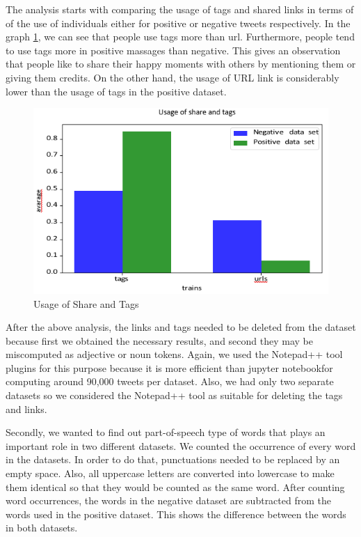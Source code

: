 \documentclass[10pt,conference,compsocconf]{IEEEtran}
\begin{document}
The analysis starts with comparing the usage of tags and shared links in terms of of the use of individuals either for positive or negative tweets respectively. In the graph \ref{fig2}, we can see that people use tags more than url. Furthermore, people tend to use tags more in positive massages than negative. This gives an observation that people like to share their happy moments with others by mentioning them or giving them credits. On the other hand, the usage of URL link is considerably lower than the usage of tags in the positive dataset.

\begin{tiny}
	\begin{figure}[b] \label{fig2}
		\includegraphics[scale=0.6]{Lkhamaa1.png}   
		\caption{Usage of Share and Tags }
		\label{fig2}    
	\end{figure}
\end{tiny}

After the above analysis, the links and tags needed to be deleted from the dataset because first we obtained the necessary results, and second they may be miscomputed as adjective or noun tokens. Again, we used the Notepad++ tool plugins for this purpose because it is more efficient than jupyter notebookfor computing around 90,000 tweets per dataset. Also, we had only two separate datasets so we considered the Notepad++ tool as suitable for deleting the tags and links. 

Secondly, we wanted to find out part-of-speech type of words that plays an important role in two different datasets. We counted the occurrence of every word in the datasets. In order to do that, punctuations needed to be replaced by an empty space. Also, all uppercase letters are converted into lowercase to make them identical so that they would be counted as the same word. After counting word occurrences, the words in the negative dataset are subtracted from the words used in the positive dataset. This shows the difference between the words in both datasets. 
\end{document}
